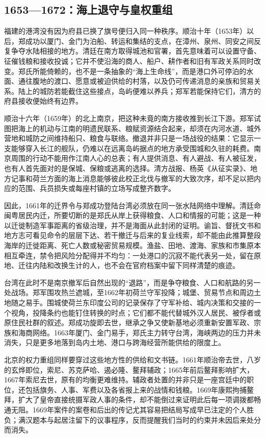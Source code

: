 \subsection{1653—1672：海上退守与皇权重组}

福建的港湾没有因为府县已换了旗号便归入同一种秩序。顺治十年（1653年）以后，郑成功以厦门、金门为泊船、转运和集结的支点，在漳州、泉州、同安之间反复争夺水陆相接的地方。清廷在南方取得城池和官署，首先意味着可以设置守备、征催钱粮和接收投诚；它并不使沿海的商人、船户、耕作者和旧有军政关系同时改变。郑氏所能倚赖的，也不是一条抽象的“海上生命线”，而是港口外可停泊的水面、通往腹地的渡口、愿意或被迫供给的村落，以及仍可传递消息的亲族和贸易关系。陆上的城防若能截住这些接点，岛屿便难以养兵；郑军若能保持它们，清方的府县接收便始终有边界。

顺治十六年（1659年）的北上南京，把这种未竟的南方接收推到长江下游。郑军试图把海上的机动与江南的明遗民联系、粮赋资源结合起来，却须在内河水道、城外营地和城防之间维持船只、粮食与联络。撤退并非只是一场战役的结果：它显示一支能够穿入长江的舰队，仍难以在远离岛屿据点的地方承受围城和久驻的耗费。南京周围的行动不能用作江南人心的总表；有人提供消息、有人避战、有人被征发，也有人首先面对的是保城、保粮或逃离的选择。清方战报、杨英《从征实录》、地方记事和荷兰方面的海上消息能够彼此校正北伐与撤军的大致次序，却不足以把内应的范围、兵员损失或每座村镇的立场写成整齐数字。

因此，1661年的迁界令与郑成功登陆台湾必须放在同一张水陆网络中理解。清廷命闽粤居民内迁，所要切断的是郑氏从岸上获得粮食、人口和情报的可能；这是一种以迁徙制造军事距离的省级治理，并不是海面从此封闭的证明。谕旨、督抚文书和地方志可看见命令的层层下达、若干撤迁与后来的复业线索，却不能由此推算整段海岸的迁徙距离、死亡人数或秘密贸易规模。渔盐、田地、渡海、家族和市集原本相互牵连，禁令把风险分配得并不均匀：一处港口的沉寂不能代表另一处，留在原地、迁往内陆和改换生计的人，也不会在官府档案中留下同样清楚的痕迹。

台湾在此时不是南京撤军后自然出现的“退路”，而是争夺粮食、人口和航路的另一处战场。郑军围攻热兰遮城，至1662年初荷兰守军投降；城堡、贸易节点和周边土地随之易手。围城使荷兰东印度公司的记录保存了守军补给、城内决策和交接的一个视角，投降条约也能钉住转换的时点；它们都不能代替城外汉人居民、被俘者或原住民社群的叙述。郑成功旋即去世，继承之争又使新基地必须重新安置军政、宗族和海商网络。1663年厦门、金门易手，郑氏主力转守台湾，海峡两边的压力并未消失，只是更多地落到岛内土地、港口与跨海经营所能供给的限度上。

北京的权力重组同样要穿过这些地方性的供给和文书链。1661年顺治帝去世，八岁的玄烨即位，索尼、苏克萨哈、遏必隆、鳌拜辅政；1665年前后鳌拜影响扩大，1667年索尼去世，原有的均衡更难维持。辅政者处置的并非只是一座宫廷中的职位，还包括旗务、人事、军费以及各省报上来的战情和钱粮。1669年康熙拘捕鳌拜，扩大了皇帝直接统摄军政人事的条件，却不能倒过来证明此后每一项调拨都畅通无阻。1669年案件的案卷和后出的传记尤其容易把结局写成早已注定的个人胜负；满汉题本与起居注留下的议事程序，反而提醒我们当时的约束并未因后来处分而消失。

